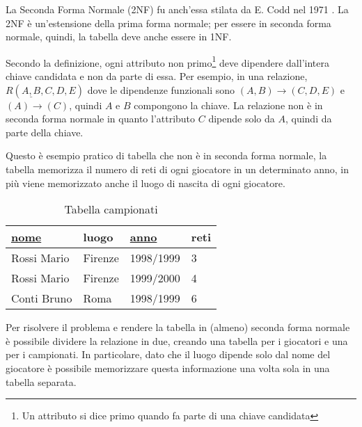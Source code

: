 La Seconda Forma Normale (2NF) fu anch'essa stilata da E. Codd nel 1971 \cite{codd:relationalmodel}. La 2NF è un'estensione della prima forma normale; per essere in seconda forma normale, quindi, la tabella deve anche essere in 1NF.

Secondo la definizione, ogni attributo non primo\footnote{Un attributo si dice primo quando fa parte di una chiave candidata} deve dipendere dall'intera chiave candidata e non da parte di essa. Per esempio, in una relazione, $R(\underline{A,B},C,D,E)$ dove le dipendenze funzionali sono $(A,B) \rightarrow (C,D,E)$ e $(A) \rightarrow (C)$, quindi $A$ e $B$ compongono la chiave. La relazione non è in seconda forma normale in quanto l'attributo $C$ dipende solo da $A$, quindi da parte della chiave.

Questo è esempio pratico \cite{book:eprogram} di tabella che non è in seconda forma normale, la tabella memorizza il numero di reti di ogni giocatore in un determinato anno, in più viene memorizzato anche il luogo di nascita di ogni giocatore.

\begin{table}
	\centering
	\caption{Tabella campionati}
	\begin{tabular}{llll}
		\textbf{\underline{nome}}                     & \textbf{luogo}               & \textbf{\underline{anno}}                  & \textbf{reti}          \\ \hline
		\multicolumn{1}{|l|}{Rossi Mario} & \multicolumn{1}{l|}{Firenze} & \multicolumn{1}{l|}{1998/1999} & \multicolumn{1}{l|}{3} \\ \hline
		\multicolumn{1}{|l|}{Rossi Mario} & \multicolumn{1}{l|}{Firenze} & \multicolumn{1}{l|}{1999/2000} & \multicolumn{1}{l|}{4} \\ \hline
		\multicolumn{1}{|l|}{Conti Bruno} & \multicolumn{1}{l|}{Roma}    & \multicolumn{1}{l|}{1998/1999} & \multicolumn{1}{l|}{6} \\ \hline
	\end{tabular}	
\end{table}

Per risolvere il problema e rendere la tabella in (almeno) seconda forma normale è possibile dividere la relazione in due, creando una tabella per i giocatori e una per i campionati. In particolare, dato che il luogo dipende solo dal nome del giocatore è possibile memorizzare questa informazione una volta sola in una tabella separata.

